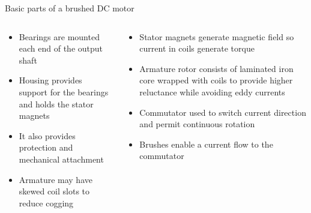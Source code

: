 \documentclass[compress]{beamer}
\begin{document}
\begin{frame}{Basic parts of a brushed DC motor}

\begin{columns}
    \footnotesize
    \begin{column}{0.5\linewidth}
    \begin{itemize}
        \item Bearings are mounted each end of the output shaft
        \item Housing provides support for the bearings and holds the stator magnets
        \item It also provides protection and mechanical attachment
        \item Armature may have skewed coil slots to reduce cogging
    \end{itemize}



    \end{column}
    \begin{column}{0.6\linewidth}
    \begin{itemize}
        \item Stator magnets generate magnetic field so current in coils generate
        torque
        \item Armature rotor consists of laminated iron core wrapped with coils to
        provide higher reluctance while avoiding eddy currents
        \item Commutator used to switch current direction and permit continuous
        rotation
        \item Brushes enable a current flow to the commutator
    \end{itemize}



\end{column}
\end{columns}
\end{frame}
\end{document}
